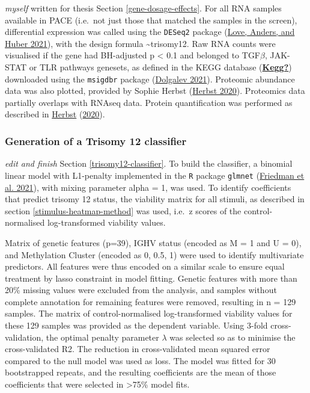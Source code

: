 \documentclass[11pt, a4paper, twosided]{book}
\begin{document}
\emph{myself} written for thesis
Section \ref{gene-dosage-effects}. For all RNA samples available in PACE (i.e.~not just those that matched the samples in the screen), differential expression was called using the \texttt{DESeq2} package (\protect\hyperlink{ref-R-DESeq2}{Love, Anders, and Huber 2021}), with the design formula \textasciitilde trisomy12. Raw RNA counts were visualised if the gene had BH-adjusted p \textless{} 0.1 and belonged to TGF\(\beta\), JAK-STAT or TLR pathways genesets, as defined in the KEGG database (\protect\hyperlink{ref-Kegg}{\textbf{Kegg?}}) downloaded using the \texttt{msigdbr} package (\protect\hyperlink{ref-R-msigdbr}{Dolgalev 2021}). Proteomic abundance data was also plotted, provided by Sophie Herbst (\protect\hyperlink{ref-HerbstThesis}{Herbst 2020}). Proteomics data partially overlaps with RNAseq data. Protein quantification was performed as described in \protect\hyperlink{ref-HerbstThesis}{Herbst} (\protect\hyperlink{ref-HerbstThesis}{2020}).

\hypertarget{trisomy12-classifier-method}{%
\subsubsection{Generation of a Trisomy 12 classifier}\label{trisomy12-classifier-method}}

\emph{edit and finish}
Section \ref{trisomy12-classifier}. To build the classifier, a binomial linear model with L1-penalty implemented in the \texttt{R} package \texttt{glmnet} (\protect\hyperlink{ref-R-glmnet}{Friedman et al. 2021}), with mixing parameter alpha = 1, was used. To identify coefficients that predict trisomy 12 status, the viability matrix for all stimuli, as described in section \ref{stimulus-heatmap-method} was used, i.e.~z scores of the control-normalised log-transformed viability values.

Matrix of genetic features (p=39), IGHV status (encoded as M = 1 and U = 0), and Methylation Cluster (encoded as 0, 0.5, 1) were used to identify multivariate predictors. All features were thus encoded on a similar scale to ensure equal treatment by lasso constraint in model fitting. Genetic features with more than 20\% missing values were excluded from the analysis, and samples without complete annotation for remaining features were removed, resulting in n = 129 samples. The matrix of control-normalised log-transformed viability values for these 129 samples was provided as the dependent variable. Using 3-fold cross-validation, the optimal penalty parameter \(\lambda\) was selected so as to minimise the cross-validated R2. The reduction in cross-validated mean squared error compared to the null model was used as loss. The model was fitted for 30 bootstrapped repeats, and the resulting coefficients are the mean of those coefficients that were selected in \textgreater75\% model fits.
\end{document}
